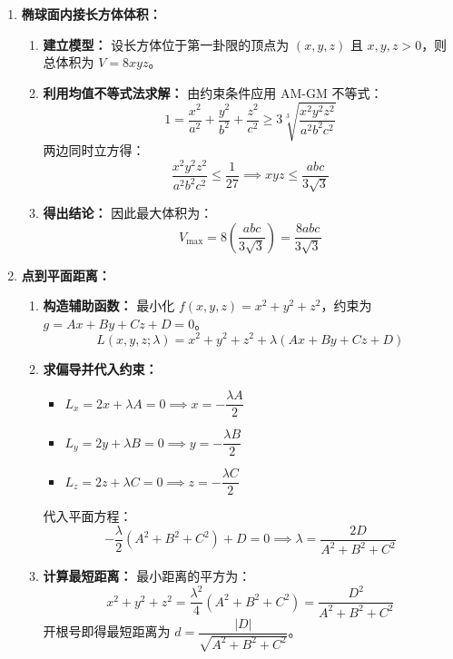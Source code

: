 \documentclass[lang=cn,11pt]{elegantbook}
\begin{document}
\begin{solution}
\begin{enumerate}
  \item[(1)] \textbf{椭球面内接长方体体积：}
  \begin{enumerate}
    \item \textbf{建立模型：}
    设长方体位于第一卦限的顶点为 $(x,y,z)$ 且 $x,y,z>0$，则总体积为 $V = 8xyz$。
    \item \textbf{利用均值不等式法求解：}
    由约束条件应用 AM-GM 不等式：
    \[
    1 = \frac{x^2}{a^2} + \frac{y^2}{b^2} + \frac{z^2}{c^2} \ge 3 \sqrt[3]{\frac{x^2 y^2 z^2}{a^2 b^2 c^2}}
    \]
    两边同时立方得：
    \[
    \frac{x^2 y^2 z^2}{a^2 b^2 c^2} \le \frac{1}{27} \implies xyz \le \frac{abc}{3\sqrt{3}}
    \]
    \item \textbf{得出结论：}
    因此最大体积为：
    \[
    V_{\max} = 8\left(\frac{abc}{3\sqrt{3}}\right) = \frac{8abc}{3\sqrt{3}}
    \]
  \end{enumerate}

  \item[(2)] \textbf{点到平面距离：}
  \begin{enumerate}
    \item \textbf{构造辅助函数：}
    最小化 $f(x,y,z) = x^2+y^2+z^2$，约束为 $g = Ax+By+Cz+D=0$。
    \[
    L(x,y,z;\lambda) = x^2+y^2+z^2 + \lambda(Ax+By+Cz+D)
    \]
    \item \textbf{求偏导并代入约束：}
    \begin{itemize}
      \item $L_x = 2x+\lambda A=0 \implies x=-\dfrac{\lambda A}{2}$
      \item $L_y = 2y+\lambda B=0 \implies y=-\dfrac{\lambda B}{2}$
      \item $L_z = 2z+\lambda C=0 \implies z=-\dfrac{\lambda C}{2}$
    \end{itemize}
    代入平面方程：
    \[
    -\frac{\lambda}{2}(A^2+B^2+C^2) + D = 0 \implies \lambda = \frac{2D}{A^2+B^2+C^2}
    \]
    \item \textbf{计算最短距离：}
    最小距离的平方为：
    \[
    x^2+y^2+z^2 = \frac{\lambda^2}{4}(A^2+B^2+C^2) = \frac{D^2}{A^2+B^2+C^2}
    \]
    开根号即得最短距离为 $d = \dfrac{|D|}{\sqrt{A^2+B^2+C^2}}$。
  \end{enumerate}


\end{enumerate}
\end{solution}
\end{document}
